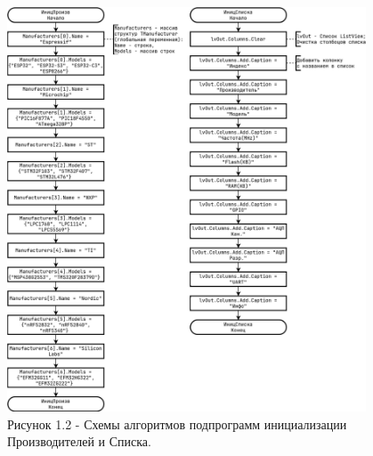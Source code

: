 \documentclass[oneside,a4paper,14pt]{extarticle}
\begin{document}
\clearpage
\begin{figure}[H]
	\centering
	\includegraphics[width=0.95\textwidth]{pics/flowchart2.png}
	\caption*{Рисунок 1.2 - Схемы алгоритмов подпрограмм инициализации Производителей и Списка.}
\end{figure}
\end{document}
